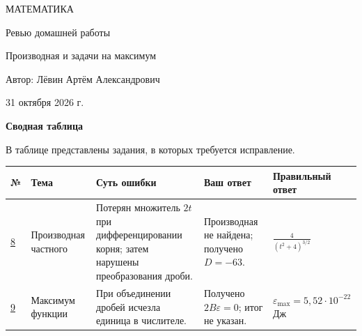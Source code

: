 \documentclass[a4paper,12pt]{article}
\begin{document}
\thispagestyle{empty}
\vspace*{29mm}
\begin{center}
  {\small\color{darkaccent} МАТЕМАТИКА}\par
  \vspace{24mm}
  {\LARGE\color{ink} Ревью домашней работы}\par
  \vspace{11mm}
  {\large\color{accent} Производная и задачи на максимум}\par
  \vspace{25mm}
  {\normalsize Автор: Лёвин Артём Александрович}\par
  \vspace{9mm}
  {\normalsize 31 октября 2026 г.}\par
\end{center}
\vfill
\begin{center}
\end{center}
\newpage
\begin{center}
  {\large\color{darkaccent}\textbf{Сводная таблица}}\par
  \vspace{3mm}
  {\small В таблице представлены задания, в которых требуется исправление.}
\end{center}
\vspace{6mm}
\small
\begin{tabularx}{\linewidth}{@{}>{\centering\arraybackslash}p{10mm} >{\raggedright\arraybackslash}p{27mm} >{\raggedright\arraybackslash}X >{\raggedright\arraybackslash}p{29mm} >{\raggedright\arraybackslash}p{31mm}@{}}
\toprule
\textbf{№} & \textbf{Тема} & \textbf{Суть ошибки} & \textbf{Ваш ответ} & \textbf{Правильный ответ}\\
\midrule
\hyperref[task:8]{8} & Производная частного & Потерян множитель $2t$ при дифференцировании корня; затем нарушены преобразования дроби. & Производная не найдена; получено $D=-63$. & $\displaystyle\frac{4}{(t^2+4)^{3/2}}$\\[5pt]
\hyperref[task:9]{9} & Максимум функции & При объединении дробей исчезла единица в числителе. & Получено $2B\varepsilon=0$; итог не указан. & $\displaystyle\varepsilon_{\max}=5{,}52\cdot10^{-22}$ Дж\\
\bottomrule
\end{tabularx}
\end{document}

